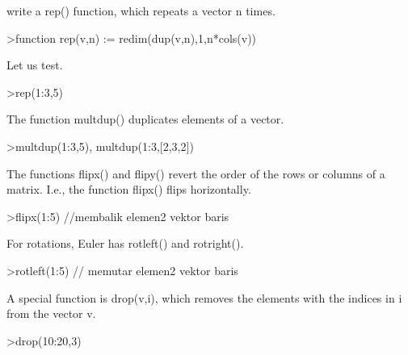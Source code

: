 \documentclass{article}
\begin{document}
\begin{eulernotebook}
\begin{eulercomment}
\begin{eulercomment}
\begin{eulercomment}
\begin{eulercomment}
\begin{eulercomment}
\begin{eulercomment}
\begin{eulercomment}
write a rep() function, which repeats a vector n times.
\end{eulercomment}
\begin{eulerprompt}
>function rep(v,n) := redim(dup(v,n),1,n*cols(v))
\end{eulerprompt}
\begin{eulercomment}
Let us test.
\end{eulercomment}
\begin{eulerprompt}
>rep(1:3,5)
\end{eulerprompt}
\begin{euleroutput}
  [1,  2,  3,  1,  2,  3,  1,  2,  3,  1,  2,  3,  1,  2,  3]
\end{euleroutput}
\begin{eulercomment}
The function multdup() duplicates elements of a vector.
\end{eulercomment}
\begin{eulerprompt}
>multdup(1:3,5), multdup(1:3,[2,3,2])
\end{eulerprompt}
\begin{euleroutput}
  [1,  1,  1,  1,  1,  2,  2,  2,  2,  2,  3,  3,  3,  3,  3]
  [1,  1,  2,  2,  2,  3,  3]
\end{euleroutput}
\begin{eulercomment}
The functions flipx() and flipy() revert the order of the rows or
columns of a matrix. I.e., the function flipx() flips horizontally.
\end{eulercomment}
\begin{eulerprompt}
>flipx(1:5) //membalik elemen2 vektor baris
\end{eulerprompt}
\begin{euleroutput}
  [5,  4,  3,  2,  1]
\end{euleroutput}
\begin{eulercomment}
For rotations, Euler has rotleft() and rotright().
\end{eulercomment}
\begin{eulerprompt}
>rotleft(1:5) // memutar elemen2 vektor baris
\end{eulerprompt}
\begin{euleroutput}
  [2,  3,  4,  5,  1]
\end{euleroutput}
\begin{eulercomment}
A special function is drop(v,i), which removes the elements with the
indices in i from the vector v.
\end{eulercomment}
\begin{eulerprompt}
>drop(10:20,3)
\end{eulerprompt}

\end{eulercomment}
\end{eulercomment}
\end{eulercomment}
\end{eulercomment}
\end{eulercomment}
\end{eulercomment}
\end{eulernotebook}
\end{document}
